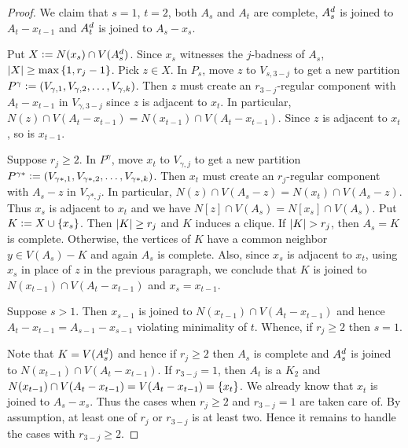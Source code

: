 \begin{proof}
			We claim that $s = 1$, $t = 2$, both $A_s$ and $A_t$ are complete,
			$A_s^{d}$ is joined to $A_t - x_{t-1}$ and $A_t^{d}$ is joined to $A_s - x_s$.
			
			Put $X \mathrel{\mathop:}= N(x_s) \cap V(A_s^{d})$.  Since $x_s$ witnesses the
			$j$-badness of $A_s$, $\left|X\right| \geq \max\left\{ 1, r_j - 1 \right\}$. Pick $z \in X$.
			In $P_s$, move $z$ to $V_{s, 3-j}$ to get a new partition $P^\gamma \mathrel{\mathop:}= \left( V_{\gamma,
			1}, V_{\gamma, 2}, \ldots, V_{\gamma, k} \right)$. Then $z$ must create an
			$r_{3-j}$-regular component with $A_t - x_{t-1}$ in $V_{\gamma, 3-j}$ since
			$z$ is adjacent to $x_t$.  
			In particular, $N(z) \cap V(A_t - x_{t-1}) = N(x_{t-1}) \cap V(A_t -
			x_{t-1})$. Since $z$ is adjacent to $x_t$, so is $x_{t-1}$. 
			
			Suppose $r_j \geq 2$. In $P^\gamma$, move $x_t$ to $V_{\gamma, j}$ to
			get a new partition $P^{\gamma*} \mathrel{\mathop:}= (V_{\gamma*, 1},
			V_{\gamma*, 2}, \ldots, V_{\gamma*, k})$. Then $x_t$ must create an
			$r_{j}$-regular component with $A_s - z$ in $V_{\gamma*, j}$.  In
			particular, $N(z) \cap V(A_s - z) = N(x_t) \cap V(A_s - z)$.  Thus $x_s$
			is adjacent to $x_t$ and we have $N[z] \cap V(A_s) = N[x_s] \cap
			V(A_s)$. Put $K \mathrel{\mathop:}= X \cup \left\{ x_s \right\}$.  Then $\left|K\right| \geq r_j$ and
			$K$ induces a clique.  If $\left|K\right| > r_j$, then $A_s = K$ is complete. 
			Otherwise, the vertices of $K$ have a common neighbor $y \in V(A_s) - K$ and
			again $A_s$ is complete. Also, since $x_s$ is adjacent to $x_t$, using $x_s$
			in place of $z$ in the previous paragraph, we conclude that $K$
			is joined to $N(x_{t-1}) \cap V(A_t - x_{t-1})$ and $x_s = x_{t-1}$.  
			
			Suppose $s > 1$.  Then $x_{s-1}$ is joined to $N(x_{t-1}) \cap V(A_t -
			x_{t-1})$ and hence $A_t - x_{t-1} = A_{s - 1} - x_{s-1}$ violating
			minimality of $t$.  Whence, if $r_j \geq 2$ then $s = 1$.  
			
			Note that $K = V(A_s^{d})$ and hence if $r_j \geq 2$ then $A_s$ is
			complete and $A_s^{d}$ is joined to $N(x_{t-1}) \cap V(A_t - x_{t-1})$.  If $r_{3-j}
			= 1$, then $A_t$ is a $K_2$ and $N(x_{t-1}) \cap V(A_t - x_{t-1}) = V(A_t -
			x_{t-1}) = \left\{ x_t \right\}$.  We already know that $x_t$ is joined to $A_s - x_s$. 
			Thus the cases when $r_j \geq 2$ and $r_{3-j} = 1$ are taken care of. By
			assumption, at least one of $r_j$ or $r_{3-j}$ is at least two.  Hence it
			remains to handle the cases with $r_{3-j} \geq 2$.


\end{proof}
